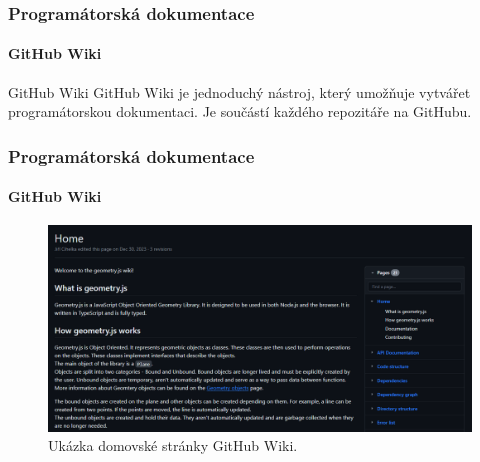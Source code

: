 \begin{frame}
    \frametitle{Programátorská dokumentace}
    \framesubtitle{GitHub Wiki}
     {
        \begin{block}{GitHub Wiki}
            GitHub Wiki je jednoduchý nástroj, který umožňuje vytvářet programátorskou dokumentaci.
            Je součástí každého repozitáře na GitHubu.
        \end{block}
    }
\end{frame}
\begin{frame}
    \frametitle{Programátorská dokumentace}
    \framesubtitle{GitHub Wiki}
    \begin{figure}
        \centering
        \includegraphics[height=0.6\textheight]{../resources/github-wiki-home.png}
        \caption{Ukázka domovské stránky GitHub Wiki.}
    \end{figure}
\end{frame}
